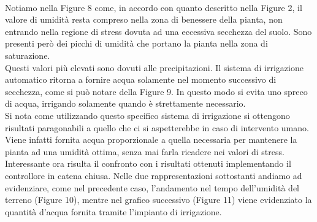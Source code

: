 \documentclass[conference,10pt]{IEEEtran}
\begin{document}
\\
Notiamo nella Figure 8 come, in accordo con quanto descritto nella Figure 2, il valore di umidità resta compreso nella zona di benessere della pianta, non entrando nella regione di stress dovuta ad una eccessiva secchezza del suolo. Sono presenti però dei picchi di umidità che portano la pianta nella zona di saturazione.\\ Questi valori più elevati sono dovuti alle precipitazioni. Il sistema di irrigazione automatico ritorna a fornire acqua solamente nel momento successivo di secchezza, come si può notare della Figure 9. In questo modo si evita uno spreco di acqua, irrigando solamente quando è strettamente necessario.\\
Si nota come utilizzando questo specifico sistema di irrigazione si ottengono risultati paragonabili a quello che ci si aspetterebbe in caso di intervento umano. Viene infatti fornita acqua proporzionale a quella necessaria per mantenere la pianta ad una umidità ottima, senza mai farla ricadere nei valori di stress.\\
Interessante ora risulta il confronto con i risultati ottenuti implementando il controllore in catena chiusa.
Nelle due rappresentazioni sottostanti andiamo ad evidenziare, come nel precedente caso, l'andamento nel tempo dell'umidità del terreno (Figure 10), mentre nel grafico successivo (Figure 11) viene evidenziato la quantità d'acqua fornita tramite l'impianto di irrigazione.








\end{document}
